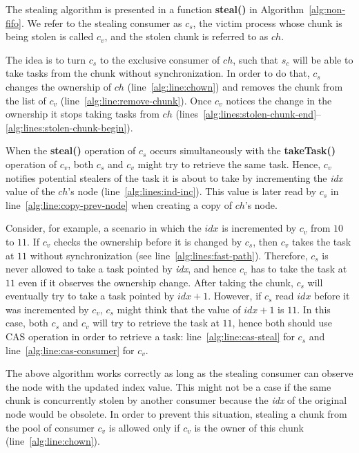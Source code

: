 The stealing algorithm is presented in a function {\bf steal()} in Algorithm~\ref{alg:non-fifo}. 
We refer to the stealing consumer as $c_s$, the victim process whose chunk is being stolen is called $c_v$, and the stolen chunk is referred to as $ch$.

The idea is to turn $c_s$ to the exclusive consumer of $ch$, such that $s_c$ will be able to take tasks from the chunk without synchronization. 
In order to do that, $c_s$ changes the ownership of $ch$ (line~\ref{alg:line:chown}) and removes the chunk from the list of $c_v$ (line~\ref{alg:line:remove-chunk}). 
Once $c_v$ notices the change in the ownership it stops taking tasks from $ch$ (lines~\ref{alg:lines:stolen-chunk-end}--\ref{alg:lines:stolen-chunk-begin}). 

When the {\bf steal()} operation of $c_s$ occurs simultaneously with the {\bf takeTask()} operation of $c_v$, both $c_s$ and $c_v$ might try to retrieve the same task. Hence, $c_v$ notifies potential stealers of the task it is about to take by incrementing the \emph{idx} value of the $ch$'s node (line~\ref{alg:lines:ind-inc}). This value is later read by $c_s$ in line~\ref{alg:line:copy-prev-node} when creating a copy of $ch$'s node.

Consider, for example, a scenario in which the $idx$ is incremented by $c_v$ from $10$ to $11$. 
If $c_v$ checks the ownership before it is changed by $c_s$, then $c_v$ takes the task at $11$ without synchronization (see line~\ref{alg:lines:fast-path}). Therefore, $c_s$ is never allowed to take a task pointed by \emph{idx}, and hence $c_v$ has to take the task at $11$ even if it observes the ownership change. 
After taking the chunk, $c_s$ will eventually try to take a task pointed by $idx+1$. However, if $c_s$ read $idx$ before it was incremented by $c_v$, $c_s$ might think that the value of $idx+1$ is $11$. In this case, both $c_s$ and $c_v$ will try to retrieve the task at $11$, hence both should use CAS operation in order to retrieve a task: line~\ref{alg:line:cas-steal} for $c_s$ and line~\ref{alg:line:cas-consumer} for $c_v$. 

The above algorithm works correctly as long as the stealing consumer can observe the node with the updated index value. 
This might not be a case if the same chunk is concurrently stolen by another consumer because the \emph{idx} of the original node would be obsolete. 
In order to prevent this situation, stealing a chunk from the pool of consumer $c_v$ is allowed only if $c_v$ is the owner of this chunk (line~\ref{alg:line:chown}). 

